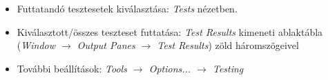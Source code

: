 \begin{frame}
  \begin{itemize}
    \item Futtatandó tesztesetek kiválasztása: \emph{Tests} nézetben.\\
    \item Kiválasztott/összes teszteset futtatása: \emph{Test Results} kimeneti ablaktábla (\emph{Window $\to$ Output Panes $\to$ Test Results}) zöld háromszögeivel\\
  \end{itemize}
\end{frame}

\begin{frame}
  \begin{itemize}
    \item További beállítások: \emph{Tools $\to$ Options... $\to$ Testing}\\
  \end{itemize}
\end{frame}
